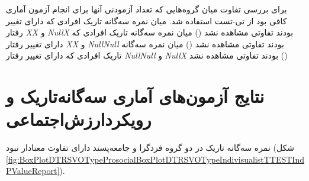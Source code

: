 برای بررسی تفاوت میان گروه‌هایی که تعداد آزمودنی آنها برای انجام آزمون آماری کافی بود از تی-تست استفاده شد. 
میان نمره سه‌گانه تاریک افرادی که دارای تغییر رفتار
\textit{\gls{XX}}
و 
\textit{\gls{NullX}}
بودند تفاوتی مشاهده نشد
(\XYNullDarkTriadXXXYNullDarkTriadNullXTTestPValueReport)
میان نمره سه‌گانه تاریک افرادی که دارای تغییر رفتار
\textit{\gls{XX}}
و 
\textit{\gls{NullNull}}
بودند تفاوتی مشاهده نشد
(\XYNullDarkTriadXXXYNullDarkTriadNullNullTTestPValueReport)
میان نمره سه‌گانه تاریک افرادی که دارای تغییر رفتار
\textit{\gls{NullNull}}
و 
\textit{\gls{NullX}}
بودند تفاوتی مشاهده نشد
(\XYNullDarkTriadNullXXYNullDarkTriadNullNullTTestPValueReport)








\section{نتایج آزمون‌های آماری سه‌گانه‌تاریک و رویکرد‌ارزش‌اجتماعی}

نمره سه‌گانه تاریک در دو گروه  فرد‌گرا و جامعه‌پسند دارای تفاوت معنادار نبود
(شکل 
\ref{fig:BoxPlotDTRSVOTypeProsocialBoxPlotDTRSVOTypeIndivisualistTTESTIndPValueReport}).

